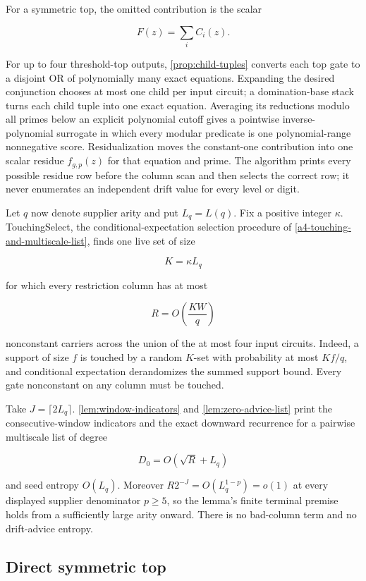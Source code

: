 \documentclass[11pt,letterpaper]{article}
\newcommand{\cref}[1]{\ref{#1}}
\let\Cref\cref
\theoremstyle{definition}
\theoremstyle{remark}
\begin{document}
For a symmetric top, the omitted contribution is the scalar

\[
F(z)=\sum_iC_i(z).
\]

For up to four threshold-top outputs, \cref{prop:child-tuples} converts each
top gate to a disjoint OR of polynomially many exact equations.
Expanding the desired conjunction chooses at most one child per input
circuit; a domination-base stack turns each child tuple into one exact
equation. Averaging its reductions modulo all primes below an explicit
polynomial cutoff gives a pointwise inverse-polynomial surrogate in
which every modular predicate is one polynomial-range nonnegative score.
Residualization moves the constant-one contribution into one scalar
residue \(f_{g,p}(z)\) for that equation and prime. The algorithm prints
every possible residue row before the column scan and then selects the
correct row; it never enumerates an independent drift value for every
level or digit.

Let \(q\) now denote supplier arity and put \(L_q=L(q)\). Fix a positive
integer \(\kappa\). TouchingSelect, the conditional-expectation selection
procedure of
\cref{a4-touching-and-multiscale-list}, finds one live set of size

\[
K=\kappa L_q
\]

for which every restriction column has at most

\[
R=O\left(\frac{KW}{q}\right)
\]

nonconstant carriers across the union of the at most four input
circuits. Indeed, a support of size \(f\) is touched by a random
\(K\)-set with probability at most \(Kf/q\), and conditional expectation
derandomizes the summed support bound. Every gate nonconstant on any
column must be touched.

Take \(J=\lceil2L_q\rceil\). \Cref{lem:window-indicators} and
\cref{lem:zero-advice-list} print the
consecutive-window indicators and the exact downward recurrence for a
pairwise multiscale list of degree

\[
D_0=O(\sqrt R+L_q)
\]

and seed entropy \(O(L_q)\). Moreover \(R2^{-J}=O(L_q^{1-p})=o(1)\) at
every displayed supplier denominator \(p\ge5\), so the lemma's finite
terminal premise holds from a sufficiently large arity onward. There is
no bad-column term and no drift-advice entropy.

\subsection{Direct symmetric top}\label{41-direct-symmetric-top}
\end{document}
